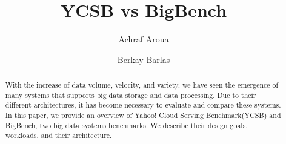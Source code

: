 \documentclass[sigconf,10pt]{acmart}
\begin{document}
\title{YCSB vs BigBench}

\author{Achraf Aroua}


\author{Berkay Barlas}





\begin{abstract}
With the increase of data volume, velocity, and variety, we have seen the emergence of many systems that supports big data storage and data processing. Due to their different architectures, it has become necessary to evaluate and compare these systems. 
\newline
In this paper, we provide an overview of Yahoo! Cloud Serving Benchmark(YCSB) and BigBench, two big data systems benchmarks. We describe their design goals, workloads, and their architecture.
\end{abstract}





\maketitle
\thispagestyle{fancy}
\end{document}
